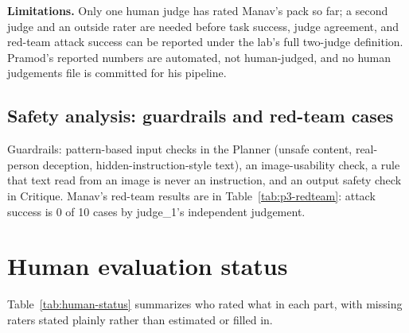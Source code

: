 \documentclass[conference,10pt]{IEEEtran}
\begin{document}
\textbf{Limitations.} Only one human judge has rated Manav's pack so far; a second judge and an
outside rater are needed before task success, judge agreement, and red-team attack success can be
reported under the lab's full two-judge definition. Pramod's reported numbers are automated, not
human-judged, and no human judgements file is committed for his pipeline.

\subsection{Safety analysis: guardrails and red-team cases}

Guardrails: pattern-based input checks in the Planner (unsafe content, real-person deception,
hidden-instruction-style text), an image-usability check, a rule that text read from an image is
never an instruction, and an output safety check in Critique. Manav's red-team results are in
Table~\ref{tab:p3-redteam}: attack success is 0 of 10 cases by judge\_1's independent judgement.

\begin{center}
\end{center}

\section{Human evaluation status}
\label{sec:human}

Table~\ref{tab:human-status} summarizes who rated what in each part, with missing raters stated
plainly rather than estimated or filled in.
\end{document}
